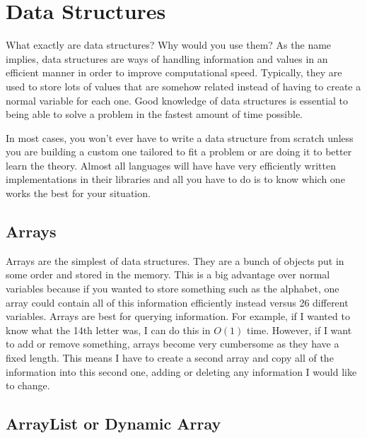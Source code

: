 \chapter{Data Structures}

What exactly are data structures? Why would you use them? As the name implies, data structures are ways of handling information and values in an efficient manner in order to improve computational speed. Typically, they are used to store lots of values that are somehow related instead of having to create a normal variable for each one. Good knowledge of data structures is essential to being able to solve a problem in the fastest amount of time possible.

In most cases, you won’t ever have to write a data structure from scratch unless you are building a custom one tailored to fit a problem or are doing it to better learn the theory. Almost all languages will have have very efficiently written implementations in their libraries and all you have to do is to know which one works the best for your situation.

\section{Arrays}

Arrays are the simplest of data structures. They are a bunch of objects put in some order and stored in the memory. This is a big advantage over normal variables because if you wanted to store something such as the alphabet, one array could contain all of this information efficiently instead versus 26 different variables. Arrays are best for querying information. For example, if I wanted to know what the 14th letter was, I can do this in $O(1)$ time. However, if I want to add or remove something, arrays become very cumbersome as they have a fixed length. This means I have to create a second array and copy all of the information into this second one, adding or deleting any information I would like to change.

\section{ArrayList or Dynamic Array}

